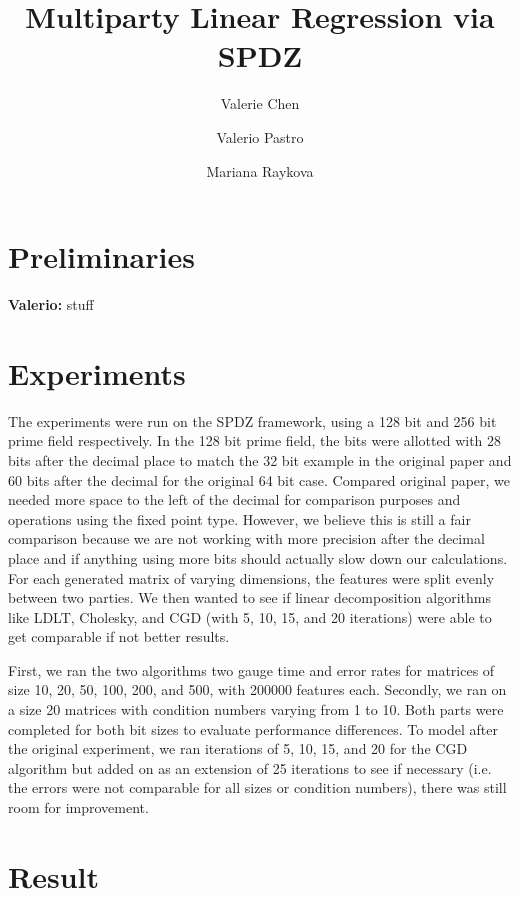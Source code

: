 \documentclass{article}
\title{Multiparty Linear Regression via SPDZ}
\author{Valerie Chen \and Valerio Pastro \and Mariana Raykova}
\theoremstyle{plain}
\theoremstyle{definition}
\theoremstyle{remark}
\newcommand{\vp}[1]{{\textcolor{dblue}{\textbf{Valerio:} #1}}}
\begin{document}
\titlepage
\maketitle

\pagebreak

\section{Preliminaries}
\vp{stuff}

\section{Experiments}
The experiments were run on the SPDZ framework, using a 128 bit and 256 bit prime field respectively. In the 128 bit prime field, the bits were allotted with 28 bits after the decimal place to match the 32 bit example in the original paper and 60 bits after the decimal for the original 64 bit case. Compared original paper, we needed more space to the left of the decimal for comparison purposes and operations using the fixed point type. However, we believe this is still a fair comparison because we are not working with more precision after the decimal place and if anything using more bits should actually slow down our calculations. For each generated matrix of varying dimensions, the features were split evenly between two parties. We then wanted to see if linear decomposition algorithms like LDLT, Cholesky, and CGD (with 5, 10, 15, and 20 iterations) were able to get comparable if not better results. 

First, we ran the two algorithms two gauge time and error rates for matrices of size 10, 20, 50, 100, 200, and 500, with 200000 features each. Secondly, we ran on a size 20 matrices with condition numbers varying from 1 to 10. Both parts were completed for both bit sizes to evaluate performance differences. To model after the original experiment, we ran iterations of 5, 10, 15, and 20 for the CGD algorithm but added on as an extension of 25 iterations to see if necessary (i.e. the errors were not comparable for all sizes or condition numbers), there was still room for improvement. 

\section{Result}
\end{document}
